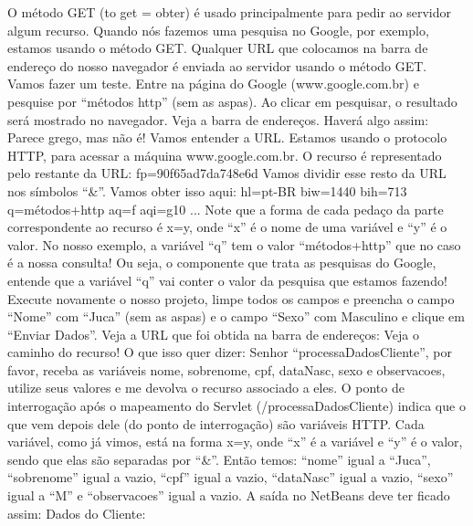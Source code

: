 O método GET (to get = obter) é usado principalmente para pedir ao servidor algum recurso. Quando nós fazemos uma pesquisa no Google, por exemplo, estamos usando o método GET. Qualquer URL que colocamos na barra de endereço do nosso navegador é enviada ao servidor usando o método GET. Vamos fazer um teste. Entre na página do Google (www.google.com.br) e pesquise por ``métodos http'' (sem as aspas). Ao clicar em pesquisar, o resultado será mostrado no navegador. Veja a barra de endereços. Haverá algo assim:
Parece grego, mas não é! Vamos entender a URL. Estamos usando o protocolo HTTP, para acessar a máquina www.google.com.br. O recurso é representado pelo restante da URL:
fp=90f65ad7da748e6d
Vamos dividir esse resto da URL nos símbolos ``\&''. Vamos obter isso aqui:
hl=pt-BR
biw=1440
bih=713
q=métodos+http
aq=f
aqi=g10
...
Note que a forma de cada pedaço da parte correspondente ao recurso é x=y, onde ``x'' é o nome de uma variável e ``y'' é o valor. No nosso exemplo, a variável ``q'' tem o valor ``métodos+http'' que no caso é a nossa consulta! Ou seja, o componente que trata as pesquisas do Google, entende que a variável ``q'' vai conter o valor da pesquisa que estamos fazendo!
Execute novamente o nosso projeto, limpe todos os campos e preencha o campo ``Nome'' com ``Juca'' (sem as aspas) e o campo ``Sexo'' com Masculino e clique em ``Enviar Dados''. Veja a URL que foi obtida na barra de endereços:
Veja o caminho do recurso!
O que isso quer dizer:
Senhor ``processaDadosCliente'', por favor, receba as variáveis nome, sobrenome, cpf, dataNasc, sexo e observacoes, utilize seus valores e me devolva o recurso associado a eles. O ponto de interrogação após o mapeamento do Servlet (/processaDadosCliente) indica que o que vem depois dele (do ponto de interrogação) são variáveis HTTP. Cada variável, como já vimos, está na forma x=y, onde ``x'' é a variável e ``y'' é o valor, sendo que elas são separadas por ``\&''. Então temos: ``nome'' igual a ``Juca'', ``sobrenome'' igual a vazio, ``cpf'' igual a vazio, ``dataNasc'' igual a vazio, ``sexo'' igual a ``M'' e ``observacoes'' igual a vazio. A saída no NetBeans deve ter ficado assim:
Dados do Cliente:
